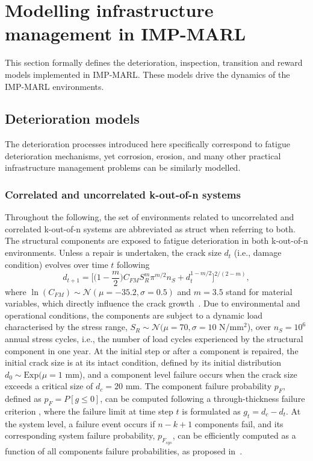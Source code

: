 \section{Modelling infrastructure management in IMP-MARL}
\label{sec:ch5_models}
This section formally defines the deterioration, inspection, transition and reward models implemented in IMP-MARL.
These models drive the dynamics of the IMP-MARL environments.

\subsection{Deterioration models}
The deterioration processes introduced here specifically correspond to fatigue deterioration mechanisms, yet corrosion, erosion, and many other practical infrastructure management problems can be similarly modelled.

\subsubsection{Correlated and uncorrelated k-out-of-n systems}
Throughout the following, the set of environments related to uncorrelated and correlated k-out-of-n systems are abbreviated as struct when referring to both. 
The structural components are exposed to fatigue deterioration in both k-out-of-n environments.
Unless a repair is undertaken, the crack size $d_t$ (i.e., damage condition) evolves over time $t$ following
\begin{equation} \label{Eq:ExamCrackGrow}
d_{t+1} =\bigg[ \Big(1-\frac{m}{2}\Big) C_{FM}S_{R}^m\pi ^{m/2}n_{S} + d_t^{1-m/2}\bigg] ^{2/(2-m)}   ,
\end{equation}
where $\ln(C_{FM}) \sim \mathcal{N} (\mu=-35.2, \sigma=0.5)$ and $m=3.5$ stand for material variables, which directly influence the crack growth~\citep{Ditlevsen2007StructuralMethods}.
Due to environmental and operational conditions, the components are subject to a dynamic load characterised by the stress range, $S_{R}  \sim  \mathcal{N} (\mu=70, \sigma=10$ N/mm$^2$), over $n_{S}=10^6$ annual stress cycles, i.e., the number of load cycles experienced by the structural component in one year.
At the initial step or after a component is repaired, the initial crack size is at its intact condition, defined by its initial distribution $d_0  \sim  \text{Exp} (\mu=1$ mm), and a component level failure occurs when the crack size exceeds a critical size of $d_c=20$ mm. 
The component failure probability $p_{F}$, defined as $p_{F}=P[g \leq 0]$, can be computed following a through-thickness failure criterion \cite{hlaing2022inspection}, where the failure limit at time step $t$ is formulated as $g_{t}=d_c-d_t$. At the system level, a failure event occurs if $n-k+1$ components fail, and its corresponding system failure probability, $p_{F_{sys}}$, can be efficiently computed as a function of all components failure probabilities, as proposed in~\citep{barlow1984computing}. 

